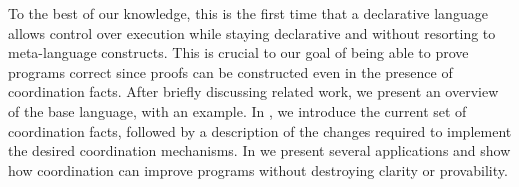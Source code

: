 To the best of our knowledge, this is the first time that a declarative language
allows control over execution while staying declarative and without resorting to
meta-language constructs. This is crucial to our goal of being able to prove
programs correct since proofs can be constructed even in the presence of
coordination facts.  After briefly discussing related work, we present an
overview of the base language, with an example. In
, we introduce the current set of coordination
facts, followed by a description of the changes required to implement the
desired coordination mechanisms. In  we present
several applications and show how coordination can improve programs without
destroying clarity or provability.
